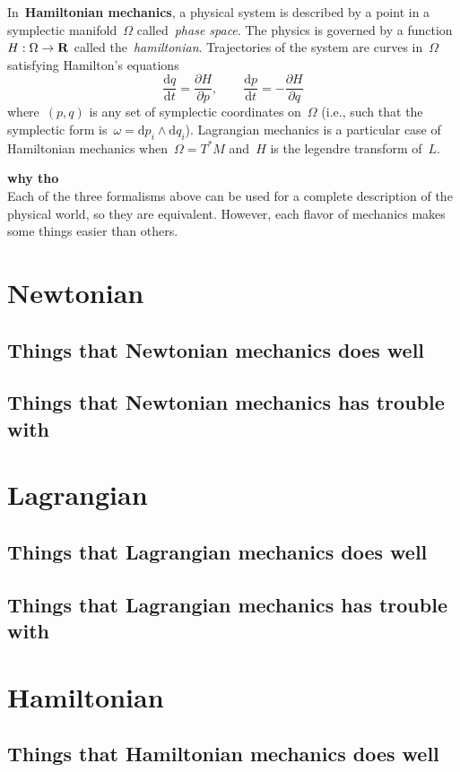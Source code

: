 In~{\bf Hamiltonian mechanics}, a physical system is described by a point in
a symplectic manifold~$\Omega$ called~\emph{phase space}.  The physics is
governed by a function~$H:\Omega\to\mathbf{R}$ called the~\emph{hamiltonian}.
Trajectories of the system are curves in~$\Omega$ satisfying Hamilton's
equations
\[
	\frac{\mathrm{d}q}{\mathrm{d}t}=\frac{\partial H}{\partial p},
	\qquad
	\frac{\mathrm{d}p}{\mathrm{d}t}=-\frac{\partial H}{\partial q}
\]
where~$(p,q)$ is any set of symplectic coordinates on~$\Omega$ (i.e., such
that the symplectic form is~$\omega=\mathrm{d}p_i\wedge\mathrm{d}q_i$).
Lagrangian mechanics is a particular case of Hamiltonian mechanics
when~$\Omega=T^*M$ and~$H$ is the legendre transform of~$L$.



{\bf why tho}\\
Each of the three formalisms above can be used for a complete description of
the physical world, so they are equivalent.  However, each flavor of
mechanics makes some things easier than others.

\section{Newtonian}

\subsection{Things that Newtonian mechanics does well}

\subsection{Things that Newtonian mechanics has trouble with}

\section{Lagrangian}

\subsection{Things that Lagrangian mechanics does well}

\subsection{Things that Lagrangian mechanics has trouble with}


\section{Hamiltonian}

\subsection{Things that Hamiltonian mechanics does well}

